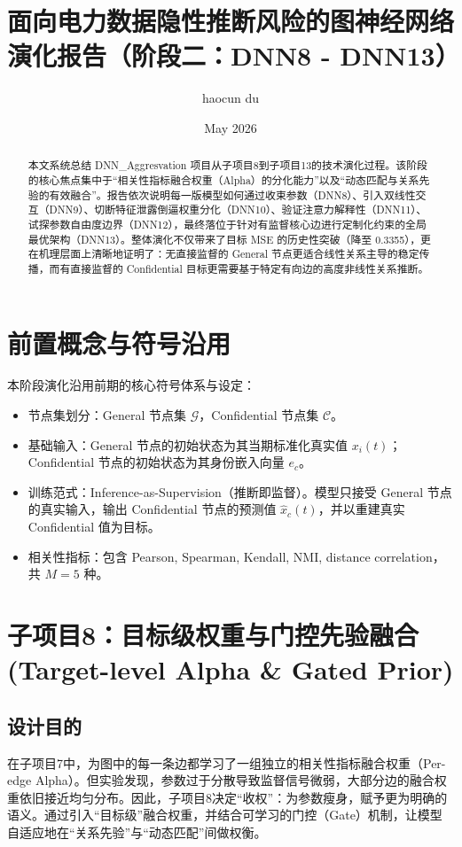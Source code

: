 \documentclass[UTF8]{ctexart}
\title{面向电力数据隐性推断风险的图神经网络演化报告（阶段二：DNN8 - DNN13）}
\author{haocun du}
\date{May 2026}
\begin{document}
\maketitle

\begin{abstract}
本文系统总结 DNN\_Aggresvation 项目从子项目8到子项目13的技术演化过程。该阶段的核心焦点集中于“相关性指标融合权重（Alpha）的分化能力”以及“动态匹配与关系先验的有效融合”。报告依次说明每一版模型如何通过收束参数（DNN8）、引入双线性交互（DNN9）、切断特征泄露倒逼权重分化（DNN10）、验证注意力解释性（DNN11）、试探参数自由度边界（DNN12），最终落位于针对有监督核心边进行定制化约束的全局最优架构（DNN13）。整体演化不仅带来了目标 MSE 的历史性突破（降至 0.3355），更在机理层面上清晰地证明了：无直接监督的 General 节点更适合线性关系主导的稳定传播，而有直接监督的 Confidential 目标更需要基于特定有向边的高度非线性关系推断。
\end{abstract}

\section{前置概念与符号沿用}

本阶段演化沿用前期的核心符号体系与设定：
\begin{itemize}
    \item 节点集划分：General 节点集 $\mathcal{G}$，Confidential 节点集 $\mathcal{C}$。
    \item 基础输入：General 节点的初始状态为其当期标准化真实值 $x_i(t)$；Confidential 节点的初始状态为其身份嵌入向量 $e_c$。
    \item 训练范式：Inference-as-Supervision（推断即监督）。模型只接受 General 节点的真实输入，输出 Confidential 节点的预测值 $\hat{x}_c(t)$，并以重建真实 Confidential 值为目标。
    \item 相关性指标：包含 Pearson, Spearman, Kendall, NMI, distance correlation，共 $M=5$ 种。
\end{itemize}

\section{子项目8：目标级权重与门控先验融合 (Target-level Alpha \& Gated Prior)}

\subsection{设计目的}
在子项目7中，为图中的每一条边都学习了一组独立的相关性指标融合权重（Per-edge Alpha）。但实验发现，参数过于分散导致监督信号微弱，大部分边的融合权重依旧接近均匀分布。因此，子项目8决定“收权”：为参数瘦身，赋予更为明确的语义。通过引入“目标级”融合权重，并结合可学习的门控（Gate）机制，让模型自适应地在“关系先验”与“动态匹配”间做权衡。
\end{document}
